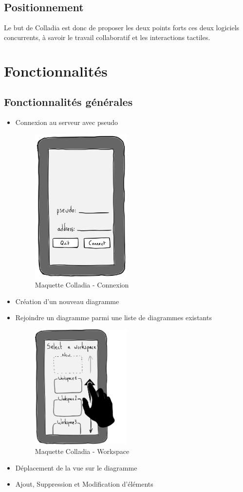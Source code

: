 \documentclass[a4paper,11pt]{article}
\begin{document}
\subsection{Positionnement}
Le but de Colladia est donc de proposer les deux points forts ces deux logiciels concurrents, à savoir le travail collaboratif et les interactions tactiles.




\section{Fonctionnalités}

\subsection{Fonctionnalités générales}
	\begin{itemize}
		\item Connexion au serveur avec pseudo
		\begin{figure}[h]
			\centering
			\includegraphics[width=5cm]{img/accueil}
			\caption{Maquette Colladia - Connexion}
		\end{figure}
		
		\item Création d'un nouveau diagramme
		\item Rejoindre un diagramme parmi une liste de diagrammes existants
		\begin{figure}[h]
			\centering
			\includegraphics[width=5cm]{img/workspace-selection}
			\caption{Maquette Colladia - Workspace}
		\end{figure}
		
		\item Déplacement de la vue sur le diagramme
		\item Ajout, Suppression et Modification d'éléments
	\end{itemize}
	
\end{document}
